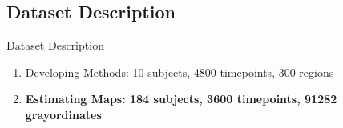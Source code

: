 \documentclass[12pt]{beamer}
\begin{document}
\subsection{Dataset Description}
\begin{frame}{Dataset Description}
    \centering
    \scriptsize
    \begin{enumerate}
    \item Developing Methods: 10 subjects, 4800 timepoints, 300 regions
    \item \textbf{Estimating Maps:  184 subjects, 3600 timepoints, 91282 grayordinates}
    \end{enumerate}
\end{frame}

\end{document}
